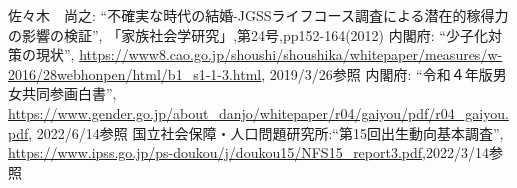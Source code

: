 \documentclass[12pt,a4j,titlepage]{ltjsarticle}
\begin{document}
\clearpage

\begin{thebibliography}{99}
 佐々木　尚之: ``不確実な時代の結婚-JGSSライフコース調査による潜在的稼得力の影響の検証'', 「家族社会学研究」,第24号,pp152-164(2012)
 内閣府: ``少子化対策の現状'', \url{https://www8.cao.go.jp/shoushi/shoushika/whitepaper/measures/w-2016/28webhonpen/html/b1_s1-1-3.html}, 2019/3/26参照
 内閣府: ``令和４年版男女共同参画白書'', \url{https://www.gender.go.jp/about_danjo/whitepaper/r04/gaiyou/pdf/r04_gaiyou.pdf}, 2022/6/14参照
国立社会保障・人口問題研究所:``第15回出生動向基本調査'',
\url{https://www.ipss.go.jp/ps-doukou/j/doukou15/NFS15_report3.pdf},2022/3/14参照
\end{thebibliography}
\end{document}
